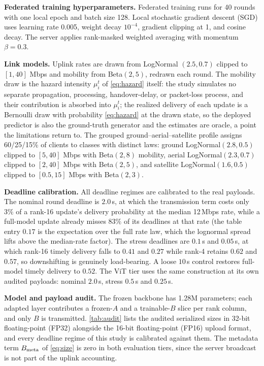 \documentclass[a4paper,fleqn]{cas-dc}
\begin{document}
\par
\textbf{Federated training hyperparameters.} Federated training runs for 40 rounds with one local epoch and batch size 128. Local stochastic gradient descent (SGD) uses learning rate 0.005, weight decay $10^{-4}$, gradient clipping at 1, and cosine decay. The server applies rank-masked weighted averaging with momentum $\beta = 0.3$.
\par
\textbf{Link models.} Uplink rates are drawn from LogNormal $(2.5,0.7)$ clipped to $[1,40]$ Mbps and mobility from Beta$(2,5)$, redrawn each round. The mobility draw is the hazard intensity $\mu_i^t$ of \cref{eq:hazard} itself: the study simulates no separate propagation, processing, handover-delay, or packet-loss process, and their contribution is absorbed into $\mu_i^t$; the realized delivery of each update is a Bernoulli draw with probability \cref{eq:hazard} at the drawn state, so the deployed predictor is also the ground-truth generator and the estimates are oracle, a point the limitations return to. The grouped ground--aerial--satellite profile assigns 60/25/15\% of clients to classes with distinct laws: ground LogNormal$(2.8,0.5)$ clipped to $[5,40]$ Mbps with Beta$(2,8)$ mobility, aerial LogNormal$(2.3,0.7)$ clipped to $[2,40]$ Mbps with Beta$(2,5)$, and satellite LogNormal$(1.6,0.5)$ clipped to $[0.5,15]$ Mbps with Beta$(2,3)$.
\par
\textbf{Deadline calibration.} All deadline regimes are calibrated to the real payloads. The nominal round deadline is $2.0$\,s, at which the transmission term costs only $3\%$ of a rank-16 update's delivery probability at the median 12\,Mbps rate, while a full-model update already misses $83\%$ of its deadlines at that rate (the table entry $0.17$ is the expectation over the full rate law, which the lognormal spread lifts above the median-rate factor). The stress deadlines are $0.1$\,s and $0.05$\,s, at which rank-16 timely delivery falls to $0.41$ and $0.27$ while rank-4 retains $0.62$ and $0.57$, so downshifting is genuinely load-bearing. A loose $10$\,s control restores full-model timely delivery to $0.52$. The ViT tier uses the same construction at its own audited payloads: nominal $2.0$\,s, stress $0.5$\,s and $0.25$\,s.
\par
\textbf{Model and payload audit.} The frozen backbone has 1.28M parameters; each adapted layer contributes a frozen-$A$ and a trainable-$B$ slice per rank column, and only $B$ is transmitted. \cref{tab:audit} lists the audited serialized sizes in 32-bit floating-point (FP32) alongside the 16-bit floating-point (FP16) upload format, and every deadline regime of this study is calibrated against them. The metadata term $B_{\rm meta}$ of \cref{eq:size} is zero in both evaluation tiers, since the server broadcast is not part of the uplink accounting.
\end{document}
